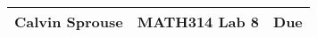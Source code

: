 \documentclass[a4paper, 12pt]{../../config/homework}
\begin{document}
\noindent
\begin{tabularx}{\textwidth}{>{\centering\arraybackslash}X>{\centering\arraybackslash}X>{\centering\arraybackslash}X}
\toprule
Calvin Sprouse & MATH314 Lab 8 & Due \\
\midrule
\end{tabularx}

\end{document}
